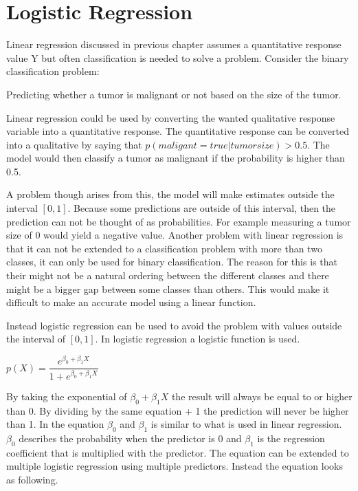 \chapter{Logistic Regression}
\label{chp:logreg}
Linear regression discussed in previous chapter assumes a quantitative response value Y but often classification is needed to solve a problem. Consider the binary classification problem:
\begin{centering}
Predicting whether a tumor is malignant or not based on the size of the tumor.
\end{centering}
Linear regression could be used by converting the wanted qualitative response variable into a quantitative response. The quantitative response can be converted into a qualitative by saying that $p(maligant = true | tumorsize) > 0.5$. The model would then classify a tumor as malignant if the probability is higher than 0.5. 

A problem though arises from this, the model will make estimates outside the interval $[0,1]$. Because some predictions are outside of this interval, then the prediction can not be thought of as probabilities. For example measuring a tumor size of 0 would yield a negative value. Another problem with linear regression is that it can not be extended to a classification problem with more than two classes, it can only be used for binary classification. The reason for this is that their might not be a natural ordering between the different classes and there might be a bigger gap between some classes than others. This would make it difficult to make an accurate model using a linear function.

Instead logistic regression can be used to avoid the problem with values outside the interval of $[0,1]$. In logistic regression a logistic function is used.

\begin{center}
	$p(X) = \dfrac{e^{\beta_0 + \beta_1 X}}{1 + e^{\beta_0 + \beta_1 X}}$ 
\end{center}

By taking the exponential of $\beta_0 + \beta_1 X$ the result will always be equal to or higher than 0. By dividing by the same equation + 1 the prediction will never be higher than 1. In the equation $\beta_0$ and $\beta_1$ is similar to what is used in linear regression. $\beta_0$ describes the probability when the predictor is 0 and $\beta_1$ is the regression coefficient that is multiplied  with the predictor. The equation can be extended to multiple logistic regression using multiple predictors. Instead the equation looks as following.

